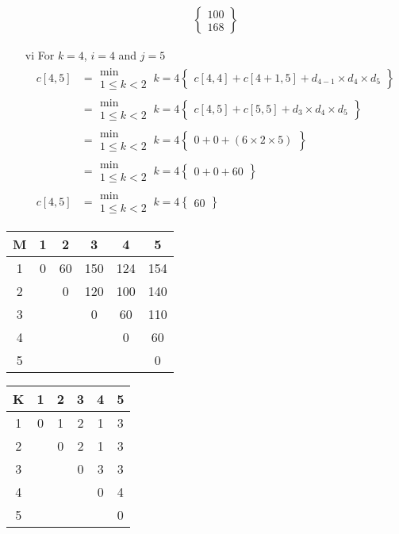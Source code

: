 \documentclass[12pt]{report}
\begin{document}
\begin{enumerate}
\begin{align*}
		\left\{
		\begin{aligned}
			100\\
			168
		\end{aligned}\right\}
	\end{align*}
	\item[vi] For $k=4$, $i = 4$ and $j=5$
	\begin{align*}
		c[4,5] &=\substack{\text{min}\\1\le k < 2}~k=4
		\left\{
		\begin{aligned}
			c[4,4] + c[4+1,5] + d_{4-1} \times d_4\times d_5
		\end{aligned}\right\}\\
		&=\substack{\text{min}\\1\le k < 2}~k=4
		\left\{
		\begin{aligned}
			c[4,5] + c[5,5] + d_{3} \times d_4\times d_5
		\end{aligned}\right\}\\
		&=\substack{\text{min}\\1\le k < 2}~k=4
		\left\{
		\begin{aligned}
			0 + 0 + (6 \times 2\times 5)
		\end{aligned}\right\}\\
		&=\substack{\text{min}\\1\le k < 2}~k=4
		\left\{
		\begin{aligned}
			0 + 0 + 60
		\end{aligned}\right\}\\
		c[4,5]&=\substack{\text{min}\\1\le k < 2}~k=4
		\left\{
		\begin{aligned}
			60
		\end{aligned}\right\}
	\end{align*}
\end{enumerate}

\begin{table}[h]
	\begin{tabular}{c|c|c|c|c|c|}
		M&1&2&3&4&5\\\hline
		1&0&60&150&124&154\\\hline
		2&&0&120&100&140\\\hline
		3&&&0&60&110\\\hline
		4&&&&0&60\\\hline
		5&&&&&0\\\hline
	\end{tabular}
	\qquad
	\begin{tabular}{c|c|c|c|c|c|}
		K&1&2&3&4&5\\\hline
		1&0&1&2&1&3\\\hline
		2&&0&2&1&3\\\hline
		3&&&0&3&3\\\hline
		4&&&&0&4\\\hline
		5&&&&&0\\\hline
	\end{tabular}
\end{table}\\
\end{document}
